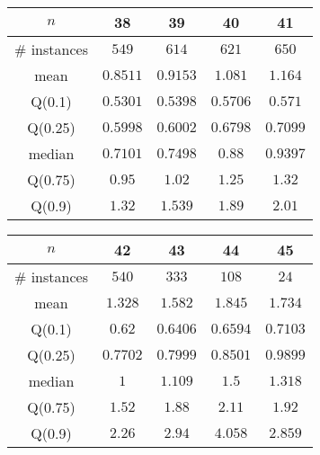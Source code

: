 \begin{tabular}{c|cccc} 
\hline 
$n$ & 38 & 39 & 40 & 41 \tabularnewline 
\hline 
\hline 
\# instances & $549$ & $614$ & $621$ & $650$ \tabularnewline 
mean & $0.8511$ & $0.9153$ & $1.081$ & $1.164$ \tabularnewline 
Q(0.1) & $0.5301$ & $0.5398$ & $0.5706$ & $0.571$ \tabularnewline 
Q(0.25) & $0.5998$ & $0.6002$ & $0.6798$ & $0.7099$ \tabularnewline 
median & $0.7101$ & $0.7498$ & $0.88$ & $0.9397$ \tabularnewline 
Q(0.75) & $0.95$ & $1.02$ & $1.25$ & $1.32$ \tabularnewline 
Q(0.9) & $1.32$ & $1.539$ & $1.89$ & $2.01$ \tabularnewline 
\hline 
\end{tabular} 
\medskip{} 

\begin{tabular}{c|cccc} 
\hline 
$n$ & 42 & 43 & 44 & 45 \tabularnewline 
\hline 
\hline 
\# instances & $540$ & $333$ & $108$ & $24$ \tabularnewline 
mean & $1.328$ & $1.582$ & $1.845$ & $1.734$ \tabularnewline 
Q(0.1) & $0.62$ & $0.6406$ & $0.6594$ & $0.7103$ \tabularnewline 
Q(0.25) & $0.7702$ & $0.7999$ & $0.8501$ & $0.9899$ \tabularnewline 
median & $1$ & $1.109$ & $1.5$ & $1.318$ \tabularnewline 
Q(0.75) & $1.52$ & $1.88$ & $2.11$ & $1.92$ \tabularnewline 
Q(0.9) & $2.26$ & $2.94$ & $4.058$ & $2.859$ \tabularnewline 
\hline 
\end{tabular} 
\medskip{} 

